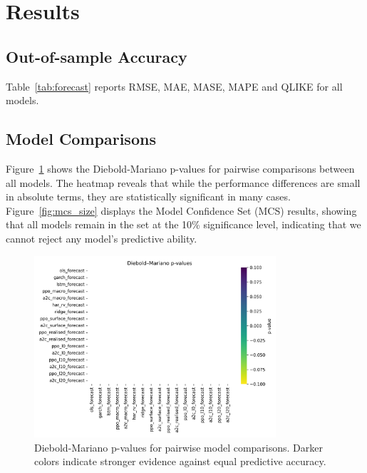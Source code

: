 \documentclass[11pt,a4paper]{article}
\begin{document}
\section{Results}
\subsection{Out-of-sample Accuracy}
Table~\ref{tab:forecast} reports RMSE, MAE, MASE, MAPE and QLIKE for all models.

\begin{table}[ht]
  \centering
  
  \caption{Out-of-sample forecast accuracy (1-day-ahead ATM-IV).  Lower values are better.  The best result is highlighted in bold.}
  \label{tab:forecast}
\end{table}

\subsection{Model Comparisons}
Figure~\ref{fig:dm_heatmap} shows the Diebold-Mariano p-values for pairwise comparisons between all models. The heatmap reveals that while the performance differences are small in absolute terms, they are statistically significant in many cases. Figure~\ref{fig:mcs_size} displays the Model Confidence Set (MCS) results, showing that all models remain in the set at the 10\% significance level, indicating that we cannot reject any model's predictive ability.

\begin{figure}[ht]
  \centering
  \includegraphics[width=0.8\textwidth]{figs/fig_dm_heatmap}
  \caption{Diebold-Mariano p-values for pairwise model comparisons. Darker colors indicate stronger evidence against equal predictive accuracy.}
  \label{fig:dm_heatmap}
\end{figure}
\end{document}
